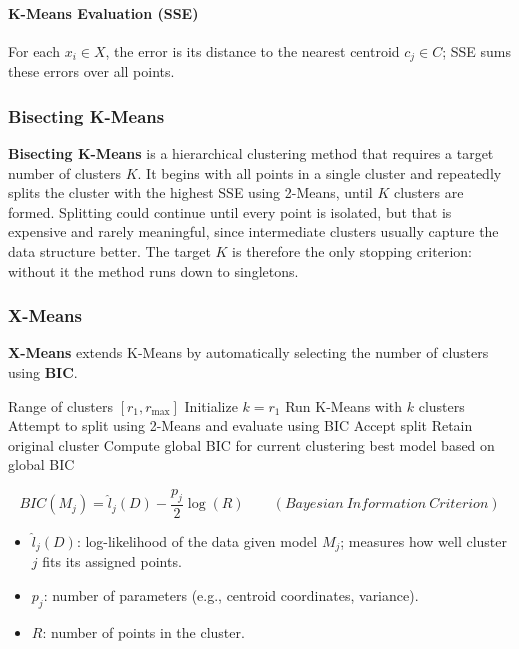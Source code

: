 \paragraph{K-Means Evaluation (SSE)} For each $x_i \in X$, the error is its distance to the nearest centroid $c_j \in C$; SSE sums these errors over all points.
\subsubsection{Bisecting K-Means}

\textbf{Bisecting K-Means} is a hierarchical clustering method that requires a target number of clusters $K$. It begins with all points in a single cluster and repeatedly splits the cluster with the highest SSE using 2-Means, until $K$ clusters are formed. Splitting could continue until every point is isolated, but that is expensive and rarely meaningful, since intermediate clusters usually capture the data structure better. The target $K$ is therefore the only stopping criterion: without it the method runs down to singletons.

\subsubsection{X-Means}

\textbf{X-Means} extends K-Means by automatically selecting the number of clusters using \textbf{BIC}.

\begin{algorithm}
\caption{X-Means Clustering}
\begin{algorithmic}[1]
\Require Range of clusters $[r_1, r_{\text{max}}]$
\State Initialize $k = r_1$
    \State Run K-Means with $k$ clusters
        \State Attempt to split using 2-Means and evaluate using BIC
            \State Accept split
        \Else
            \State Retain original cluster
        \EndIf
    \EndFor
    \State Compute global BIC for current clustering
        \State \Return best model based on global BIC
    \EndIf
\EndWhile
\end{algorithmic}
\end{algorithm}
\begin{equation}\label{BIC}
BIC(M_j) = \hat{l}_j(D) - \frac{p_j}{2} \log(R) \qquad (Bayesian~Information~Criterion)
\end{equation}

\begin{itemize}
    \item $\hat{l}_j(D)$: log-likelihood of the data given model $M_j$; measures how well cluster $j$ fits its assigned points.
    \item $p_j$: number of parameters (e.g., centroid coordinates, variance).
    \item $R$: number of points in the cluster.
\end{itemize}

